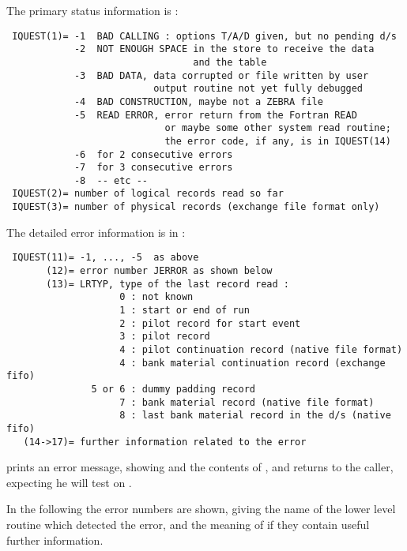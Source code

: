 The primary status information is :

\begin{verbatim}
 IQUEST(1)= -1  BAD CALLING : options T/A/D given, but no pending d/s
            -2  NOT ENOUGH SPACE in the store to receive the data
                                 and the table
            -3  BAD DATA, data corrupted or file written by user
                          output routine not yet fully debugged
            -4  BAD CONSTRUCTION, maybe not a ZEBRA file
            -5  READ ERROR, error return from the Fortran READ
                            or maybe some other system read routine;
                            the error code, if any, is in IQUEST(14)
            -6  for 2 consecutive errors
            -7  for 3 consecutive errors
            -8  -- etc --
 IQUEST(2)= number of logical records read so far
 IQUEST(3)= number of physical records (exchange file format only)
\end{verbatim}

The detailed error information is in :

\begin{verbatim}
 IQUEST(11)= -1, ..., -5  as above
       (12)= error number JERROR as shown below
       (13)= LRTYP, type of the last record read :
                    0 : not known
                    1 : start or end of run
                    2 : pilot record for start event
                    3 : pilot record
                    4 : pilot continuation record (native file format)
                    4 : bank material continuation record (exchange fifo)
               5 or 6 : dummy padding record
                    7 : bank material record (native file format)
                    8 : last bank material record in the d/s (native fifo)
   (14->17)= further information related to the error
\end{verbatim}

 prints an error message, showing  
and the contents of \IQUEST,
and returns to the caller, expecting he will test on .

In the following the error numbers  are shown, giving the name
of the lower level routine which detected the error, and the meaning
of  if they contain useful further information.

\subsection*{}

